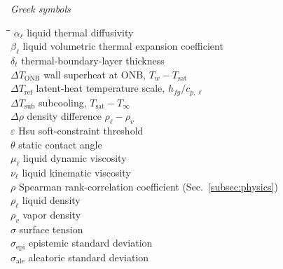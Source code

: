 \noindent\textit{Greek symbols}
\begin{tabbing}
\hspace{2.4cm}\=\hspace{10cm}\=\kill
$\alpha_{\ell}$    \> liquid thermal diffusivity                          \> [\si{m^2/s}] \\
$\beta_{\ell}$     \> liquid volumetric thermal expansion coefficient     \> [\si{1/K}] \\
$\delta_t$         \> thermal-boundary-layer thickness                    \> [m] \\
$\Delta T_{\mathrm{ONB}}$ \> wall superheat at ONB, $T_w-T_{\mathrm{sat}}$ \> [K] \\
$\Delta T_{\mathrm{ref}}$ \> latent-heat temperature scale, $h_{fg}/c_{p,\ell}$ \> [K] \\
$\Delta T_{\mathrm{sub}}$ \> subcooling, $T_{\mathrm{sat}}-T_{\infty}$    \> [K] \\
$\Delta\rho$       \> density difference $\rho_{\ell}-\rho_v$             \> [\si{kg/m^3}] \\
$\varepsilon$      \> Hsu soft-constraint threshold                       \> [---] \\
$\theta$           \> static contact angle                                \> [\si{\degree}] \\
$\mu_{\ell}$       \> liquid dynamic viscosity                            \> [\si{Pa.s}] \\
$\nu_{\ell}$       \> liquid kinematic viscosity                          \> [\si{m^2/s}] \\
$\rho$             \> Spearman rank-correlation coefficient (Sec.~\ref{subsec:physics}) \> [---] \\
$\rho_{\ell}$      \> liquid density                                      \> [\si{kg/m^3}] \\
$\rho_v$           \> vapor density                                       \> [\si{kg/m^3}] \\
$\sigma$           \> surface tension                                     \> [\si{N/m}] \\
$\sigma_{\mathrm{epi}}$  \> epistemic standard deviation                  \> [K] \\
$\sigma_{\mathrm{ale}}$  \> aleatoric standard deviation                  \> [K] \\
\end{tabbing}

